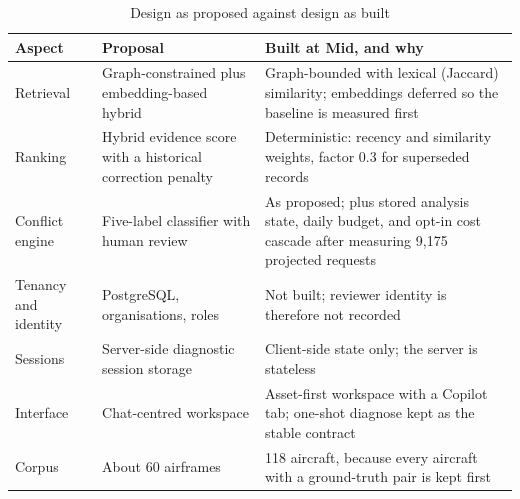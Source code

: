 \begin{table}[H]
\centering
\caption{Design as proposed against design as built}
\label{tab:design-evolution}
\small
\begin{tabularx}{\textwidth}{@{}>{\raggedright\arraybackslash}p{} L L@{}}
\toprule
Aspect & Proposal & Built at Mid, and why \\
\midrule
Retrieval & Graph-constrained plus embedding-based hybrid & Graph-bounded with lexical (Jaccard) similarity; embeddings deferred so the baseline is measured first \\
Ranking & Hybrid evidence score with a historical correction penalty & Deterministic: recency and similarity weights, factor 0.3 for superseded records \\
Conflict engine & Five-label classifier with human review & As proposed; plus stored analysis state, daily budget, and opt-in cost cascade after measuring 9{,}175 projected requests \\
Tenancy and identity & PostgreSQL, organisations, roles & Not built; reviewer identity is therefore not recorded \\
Sessions & Server-side diagnostic session storage & Client-side state only; the server is stateless \\
Interface & Chat-centred workspace & Asset-first workspace with a Copilot tab; one-shot diagnose kept as the stable contract \\
Corpus & About 60 airframes & 118 aircraft, because every aircraft with a ground-truth pair is kept first \\
\bottomrule
\end{tabularx}
\end{table}
